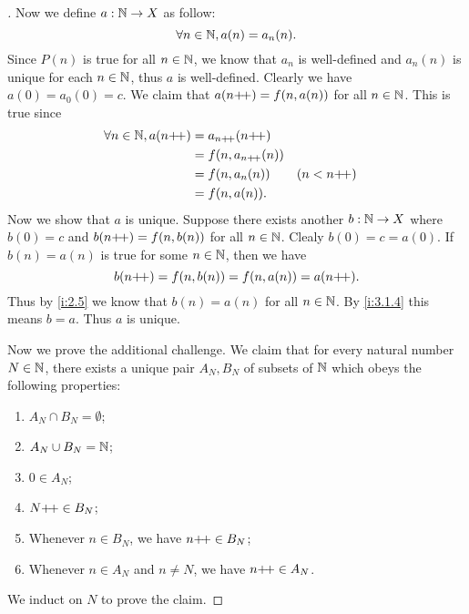 \begin{proof}[]
  Now we define \(a : \mathbb{N} \to X\) as follow:
  \[
    \forall n \in \mathbb{N}, a(n) = a_n(n).
  \]
  Since \(P(n)\) is true for all \(n \in \mathbb{N}\), we know that \(a_n\) is well-defined and \(a_n(n)\) is unique for each \(n \in \mathbb{N}\), thus \(a\) is well-defined.
  Clearly we have \(a(0) = a_0(0) = c\).
  We claim that \(a(n{+}\!{+}) = f(n, a(n))\) for all \(n \in \mathbb{N}\).
  This is true since
  \begin{align*}
    \forall n \in \mathbb{N}, a(n{+}\!{+}) & = a_{n{+}\!{+}}(n{+}\!{+})                    \\
                              & = f(n, a_{n{+}\!{+}}(n))                 \\
                              & = f(n, a_n(n))      &  & (n < n{+}\!{+}) \\
                              & = f(n, a(n)).
  \end{align*}
  Now we show that \(a\) is unique.
  Suppose there exists another \(b : \mathbb{N} \to X\) where \(b(0) = c\) and \(b(n{+}\!{+}) = f(n, b(n))\) for all \(n \in \mathbb{N}\).
  Clealy \(b(0) = c = a(0)\).
  If \(b(n) = a(n)\) is true for some \(n \in \mathbb{N}\), then we have
  \[
    b(n{+}\!{+}) = f(n, b(n)) = f(n, a(n)) = a(n{+}\!{+}).
  \]
  Thus by \cref{i:2.5} we know that \(b(n) = a(n)\) for all \(n \in \mathbb{N}\).
  By \cref{i:3.1.4} this means \(b = a\).
  Thus \(a\) is unique.

  Now we prove the additional challenge.
  We claim that for every natural number \(N \in \mathbb{N}\), there exists a unique pair \(A_N, B_N\) of subsets of \(\mathbb{N}\) which obeys the following properties:
  \begin{enumerate}
    \item \(A_N \cap B_N = \emptyset\);
    \item \(A_N \cup B_N = \mathbb{N}\);
    \item \(0 \in A_N\);
    \item \(N{+}\!{+} \in B_N\);
    \item Whenever \(n \in B_N\), we have \(n{+}\!{+} \in B_N\);
    \item Whenever \(n \in A_N\) and \(n \neq N\), we have \(n{+}\!{+} \in A_N\).
  \end{enumerate}
  We induct on \(N\) to prove the claim.


\end{proof}
